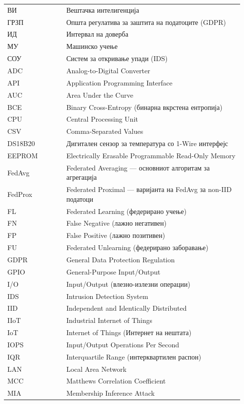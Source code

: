 \begin{longtable}{p{0.24\linewidth} >{\raggedright\arraybackslash}p{0.72\linewidth}}
ВИ & Вештачка интелигенција \\
ГРЗП & Општа регулатива за заштита на податоците (GDPR) \\
ИД & Интервал на доверба \\
МУ & Машинско учење \\
СОУ & Систем за откривање упади (IDS) \\
ADC & Analog-to-Digital Converter \\
API & Application Programming Interface \\
AUC & Area Under the Curve \\
BCE & Binary Cross-Entropy (бинарна вкрстена ентропија) \\
CPU & Central Processing Unit \\
CSV & Comma-Separated Values \\
DS18B20 & Дигитален сензор за температура со 1-Wire интерфејс \\
EEPROM & Electrically Erasable Programmable Read-Only Memory \\
FedAvg & Federated Averaging --- основниот алгоритам за агрегација \\
FedProx & Federated Proximal --- варијанта на FedAvg за non-IID податоци \\
FL & Federated Learning (федерирано учење) \\
FN & False Negative (лажно негативен) \\
FP & False Positive (лажно позитивен) \\
FU & Federated Unlearning (федерирано заборавање) \\
GDPR & General Data Protection Regulation \\
GPIO & General-Purpose Input/Output \\
I/O & Input/Output (влезно-излезни операции) \\
IDS & Intrusion Detection System \\
IID & Independent and Identically Distributed \\
IIoT & Industrial Internet of Things \\
IoT & Internet of Things (Интернет на нештата) \\
IOPS & Input/Output Operations Per Second \\
IQR & Interquartile Range (интерквартилен распон) \\
LAN & Local Area Network \\
MCC & Matthews Correlation Coefficient \\
MIA & Membership Inference Attack \\

\end{longtable}
